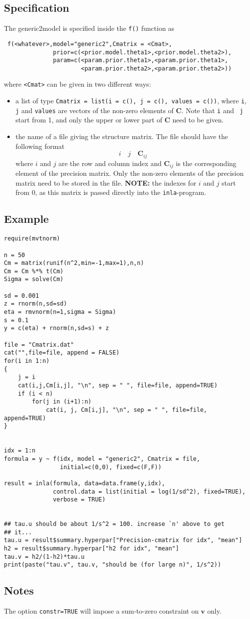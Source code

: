 \documentclass[a4paper,11pt]{article}
\def\mm#1{\ensuremath{\boldsymbol{#1}}} %
\begin{document}
\subsection*{Specification}

The generic2model is specified inside the {\tt f()} function as
\begin{verbatim}
 f(<whatever>,model="generic2",Cmatrix = <Cmat>,
              prior=c(<prior.model.theta1>,<prior.model.theta2>),
              param=c(<param.prior.theta1>,<param.prior.theta1>,
                      <param.prior.theta2>,<param.prior.theta2>))
\end{verbatim}
where {\tt <Cmat>} can be given in two different ways:
\begin{itemize}
\item a list of type {\tt Cmatrix = list(i = c(), j = c(), values =
        c())}, where {\tt i}, {\tt j} and {\tt values} are vectors of
    the non-zero elements of $\mathbf{C}$. Note that {\tt i} and {\tt
        j} start from 1, and only the upper or lower part of
    $\mathbf{C}$ need to be given.
\item the name of a file giving the structure matrix. The file should
    have the following format
    \[
    i\quad j\quad \mathbf{C}_{ij}
    \]
    where $i$ and $j$ are the row and column index and
    $\mathbf{C}_{ij}$ is the corresponding element of the precision
    matrix. Only the non-zero elements of the precision matrix need to
    be stored in the file. {\bf NOTE:} the indexes for $i$ and $j$
    start from 0, as this matrix is passed directly into the
    \texttt{inla}-program.
\end{itemize}

\subsection*{Example}
{\small\begin{verbatim}
require(mvtnorm)

n = 50
Cm = matrix(runif(n^2,min=-1,max=1),n,n)
Cm = Cm %*% t(Cm)
Sigma = solve(Cm)

sd = 0.001
z = rnorm(n,sd=sd)
eta = rmvnorm(n=1,sigma = Sigma)
s = 0.1
y = c(eta) + rnorm(n,sd=s) + z

file = "Cmatrix.dat"
cat("",file=file, append = FALSE)
for(i in 1:n)
{
    j = i
    cat(i,j,Cm[i,j], "\n", sep = " ", file=file, append=TRUE)
    if (i < n)
        for(j in (i+1):n)
            cat(i, j, Cm[i,j], "\n", sep = " ", file=file, append=TRUE)
}


idx = 1:n
formula = y ~ f(idx, model = "generic2", Cmatrix = file,
                initial=c(0,0), fixed=c(F,F))

result = inla(formula, data=data.frame(y,idx),
              control.data = list(initial = log(1/sd^2), fixed=TRUE),
              verbose = TRUE)


## tau.u should be about 1/s^2 = 100. increase `n' above to get
## it...
tau.u = result$summary.hyperpar["Precision-cmatrix for idx", "mean"]
h2 = result$summary.hyperpar["h2 for idx", "mean"]
tau.v = h2/(1-h2)*tau.u
print(paste("tau.v", tau.v, "should be (for large n)", 1/s^2))
\end{verbatim}}

\subsection*{Notes}

The option \texttt{constr=TRUE} will impose a sum-to-zero constraint
on $\mm{v}$ only.
\end{document}
